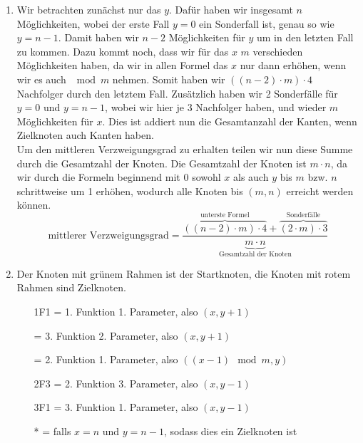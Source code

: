 \documentclass[german,colorful]{ExerciseLua}
\begin{document}
\begin{exercise}{1}
\begin{enumerate}[label=\alph*)]
\begin{center}
            \end{center}
            \item Wir betrachten zunächst nur das $y$. Dafür haben wir insgesamt $n$ Möglichkeiten, wobei der erste Fall $y=0$ ein Sonderfall ist, genau so wie $y=n-1$. Damit haben wir $n-2$ Möglichkeiten für $y$ um in den letzten Fall zu kommen. Dazu kommt noch, dass wir für das $x$ $m$ verschieden Möglichkeiten haben, da wir in allen Formel das $x$ nur dann erhöhen, wenn wir es auch $\mod m$ nehmen. Somit haben wir $\left(\left(n - 2\right) \cdot m\right) \cdot 4$ Nachfolger durch den letztem Fall. Zusätzlich haben wir 2 Sonderfälle für $y=0$ und $y=n-1$, wobei wir hier je 3 Nachfolger haben, und wieder $m$ Möglichkeiten für $x$. Dies ist addiert nun die Gesamtanzahl der Kanten, wenn Zielknoten auch Kanten haben. \\
            Um den mittleren Verzweigungsgrad zu erhalten teilen wir nun diese Summe durch die Gesamtzahl der Knoten. Die Gesamtzahl der Knoten ist $m \cdot n$, da wir durch die Formeln beginnend mit $0$ sowohl $x$ als auch $y$ bis $m$ bzw. $n$ schrittweise um 1 erhöhen, wodurch alle Knoten bis $(m,n)$ erreicht werden können.
            \[\text{mittlerer Verzweigungsgrad} = \frac{\overbrace{\left(\left(n - 2\right) \cdot m\right) \cdot 4}^{\text{unterste Formel}} + \overbrace{\left(2 \cdot m\right) \cdot 3}^{\text{Sonderfälle}}}{\underbrace{m \cdot n}_{\text{Gesamtzahl der Knoten}}} \]
            \pagebreak\item Der Knoten mit {\color{betterGreen}grünem} Rahmen ist der Startknoten, die Knoten mit {\color{emorot}rotem} Rahmen sind Zielknoten.
            \begin{enumerate}
                \item[\color{olive}1F1] = 1. Funktion 1. Parameter, also $(x,y+1)$
                \item[\color{betterGreen}{3F2}] = 3. Funktion 2. Parameter, also $(x,y+1)$
                \item[\color{teal}{2F1}] = 2. Funktion 1. Parameter, also $((x-1) \mod m, y)$
                \item[\color{blue}2F3] = 2. Funktion 3. Parameter, also $(x,y-1)$
                \item[\color{emorot}3F1] = 3. Funktion 1. Parameter, also $(x, y-1)$
                \item[{\color{pink}*}] = falls $x=n$ und $y=n-1$, sodass dies ein Zielknoten ist

\end{enumerate}
\end{enumerate}
\end{exercise}
\end{document}

